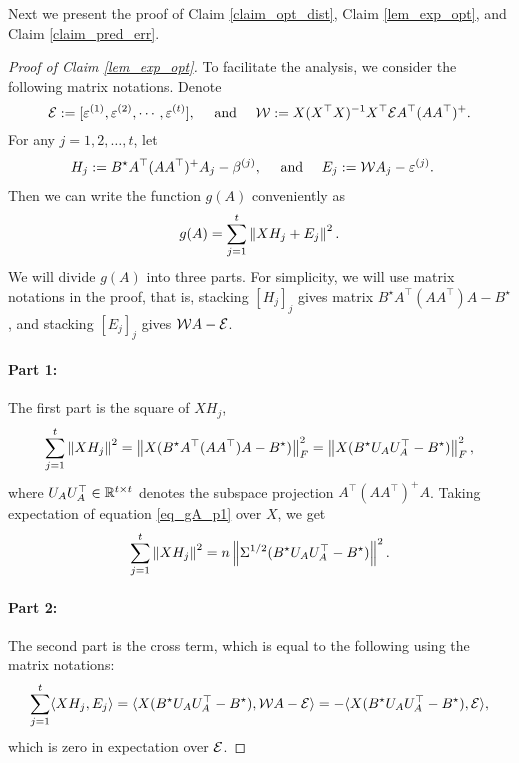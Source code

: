 Next we present the proof of Claim \ref{claim_opt_dist}, Claim \ref{lem_exp_opt}, and Claim \ref{claim_pred_err}. 
	\begin{proof}[Proof of Claim \ref{lem_exp_opt}]
	To facilitate the analysis, we consider the following matrix notations.
	Denote
\[\mathcal{E}  :=[\varepsilon^{(1)},\varepsilon^{(2)},\cdots, \varepsilon^{(t)}],  \quad \text{ and } \quad {\mathcal W} := X(X^{\top} X)^{-1} X^{\top} \mathcal{E} A^{\top} (AA^{\top})^{+}. \]
	For any $j = 1,2,\dots, t$, let
	\begin{align*}
		H_j &:= B^{\star} A^{\top} (AA^{\top})^{+} A_j - \beta^{(j)}, \quad \text{ and } \quad E_j := {\mathcal W} A_j - \varepsilon^{(j)}.
	\end{align*}
	Then we can write the function $g(A)$ conveniently as
	\[ g(A) = \sum_{j=1}^t \left\| X H_j + E_j \right\|^2. \]
	We will divide $g(A)$ into three parts.
	For simplicity, we will use matrix notations in the proof, %
	that is, stacking $[H_j]_j$ gives matrix $B^{\star} A^{\top} (AA^{\top}) A - B^{\star}$,
	and stacking $[E_j]_j$ gives ${\mathcal W} A - \mathcal{E}$.

	\paragraph{Part 1:} The first part is the square of $XH_j$,
	\begin{align}\label{eq_gA_p1}
		\sum_{j=1}^t \left\| X H_j \right\|^2
		= \left\| X (B^{\star} A^{\top} (AA^{\top}) A - B^{\star}) \right\|_{F}^2
		= \left\| X (B^{\star} U_A U_A^{\top} - B^{\star}) \right\|_{F}^2,
	\end{align}
	where $U_{A} U_{A}^{\top} \in\mathbb{R}^{t\times t}$ denotes the subspace projection $ {A}^{\top} ( {A}{A}^{\top})^{+}  {A}$.
	Taking expectation of equation \eqref{eq_gA_p1} over $X$, we get
		\[ \sum_{j=1}^t \left\| X H_j \right\|^2=n\left\| \Sigma^{1/2}(B^{\star} U_A U_A^{\top} - B^{\star}) \right\|^2. \]

	\paragraph{Part 2:} The second part is the cross term, which is equal to the following using the matrix notations:
	\begin{align}\label{eq_gA_p2}
		\sum_{j=1}^t\langle XH_j, E_j \rangle = \langle X(B^{\star} U_A U_A^{\top} - B^{\star}), {\mathcal W} A - \mathcal{E} \rangle
		= - \langle X (B^{\star} U_A U_A^{\top} - B^{\star}), \mathcal{E} \rangle,
	\end{align}
	which is zero in expectation over $\mathcal{E}$.


\end{proof}
